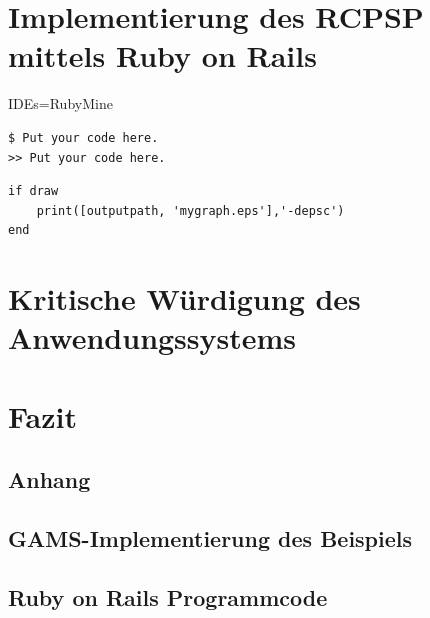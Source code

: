 \documentclass[a4paper,12pt,parskip,bibtotoc,liststotoc]{article}
\begin{document}
\section{Implementierung des RCPSP mittels Ruby on Rails} \label{Haupt}

IDEs=RubyMine

\begin{lstlisting}[style=Befehl]
$ Put your code here.
>> Put your code here.
\end{lstlisting}

\begin{lstlisting}[caption=Beispielcode, style=Listing]
if draw
    print([outputpath, 'mygraph.eps'],'-depsc')
end
\end{lstlisting}


%



\section{Kritische Würdigung des Anwendungssystems} \label{krit}

\section{Fazit} \label{Fazit}

\newpage

\newpage
%
%
\begin{appendix}
\section{Anhang}

\subsection{GAMS-Implementierung des Beispiels}\label{Imp}

\subsection{Ruby on Rails Programmcode}\label{Anhang2}


\end{appendix}
\end{document}
